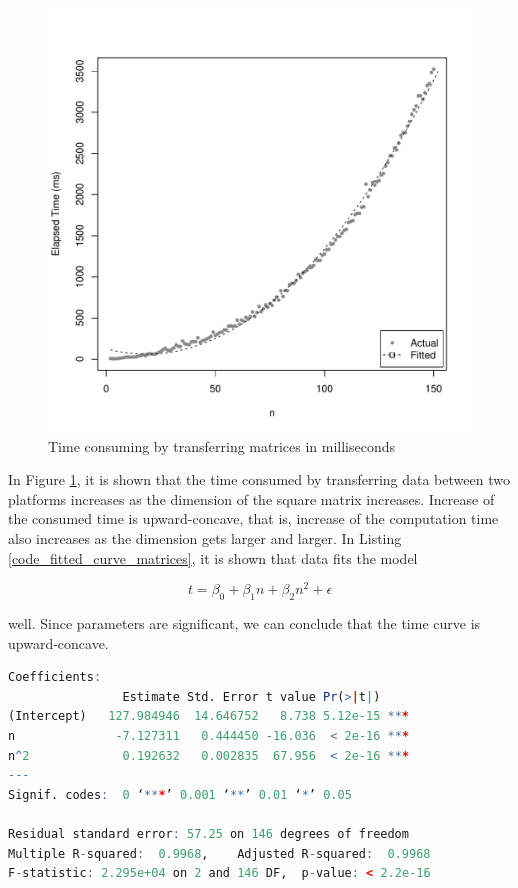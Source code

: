 \documentclass[10pt,a4paper, final, oneside]{article}
\begin{document}
\begin{figure}
\centering
	\includegraphics[scale=0.7]{MatrixSendReceive.pdf}
	\caption{Time consuming by transferring matrices in milliseconds}
	\label{fig:time_consuming_transfer_matrix}
\end{figure}


In Figure \ref{fig:time_consuming_transfer_matrix}, it is shown that the time consumed by transferring data between two platforms increases as the dimension of the square matrix increases. Increase of the consumed time is upward-concave, that is, increase of the computation time also increases as the dimension gets larger and larger. In Listing \ref{code_fitted_curve_matrices}, it is shown that data fits the model

\begin{equation}
t = \beta_0 + \beta_1 n +  \beta_2 n^2 + \epsilon
\end{equation}

\noindent well. Since parameters are significant, we can conclude that the time curve is upward-concave. 

\begin{minipage}{\linewidth}
\begin{lstlisting}[language=R,frame=single,caption=Fitted Curve,label=code_fitted_curve_matrices]
Coefficients:
                Estimate Std. Error t value Pr(>|t|)    
(Intercept)   127.984946  14.646752   8.738 5.12e-15 ***
n              -7.127311   0.444450 -16.036  < 2e-16 ***
n^2             0.192632   0.002835  67.956  < 2e-16 ***
---
Signif. codes:  0 ‘***’ 0.001 ‘**’ 0.01 ‘*’ 0.05 

Residual standard error: 57.25 on 146 degrees of freedom
Multiple R-squared:  0.9968,	Adjusted R-squared:  0.9968 
F-statistic: 2.295e+04 on 2 and 146 DF,  p-value: < 2.2e-16
\end{lstlisting}
\end{minipage}
\end{document}

